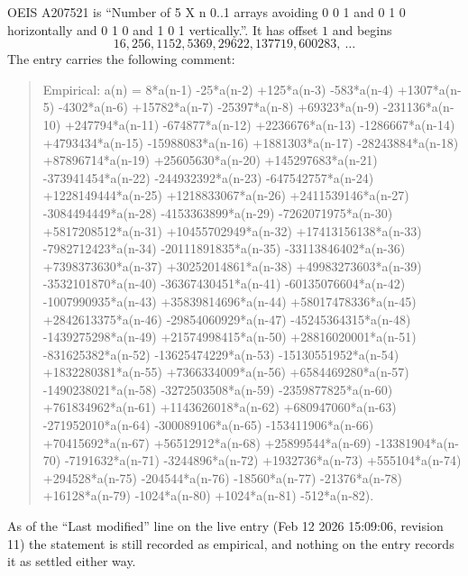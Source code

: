 \documentclass[11pt,a4paper]{article}
\theoremstyle{plain}
\theoremstyle{definition}
\begin{document}
OEIS A207521 is ``Number of 5 X n 0..1 arrays avoiding 0 0 1 and 0 1 0 horizontally and 0 1 0 and 1 0 1 vertically.''. It has offset
$1$ and begins
\[
16, 256, 1152, 5369, 29622, 137719, 600283,\ \dots
\]
The entry carries the following comment:
\begin{quote}\small
Empirical: a(n) = 8*a(n-1) -25*a(n-2) +125*a(n-3) -583*a(n-4) +1307*a(n-5) -4302*a(n-6) +15782*a(n-7) -25397*a(n-8) +69323*a(n-9) -231136*a(n-10) +247794*a(n-11) -674877*a(n-12) +2236676*a(n-13) -1286667*a(n-14) +4793434*a(n-15) -15988083*a(n-16) +1881303*a(n-17) -28243884*a(n-18) +87896714*a(n-19) +25605630*a(n-20) +145297683*a(n-21) -373941454*a(n-22) -244932392*a(n-23) -647542757*a(n-24) +1228149444*a(n-25) +1218833067*a(n-26) +2411539146*a(n-27) -3084494449*a(n-28) -4153363899*a(n-29) -7262071975*a(n-30) +5817208512*a(n-31) +10455702949*a(n-32) +17413156138*a(n-33) -7982712423*a(n-34) -20111891835*a(n-35) -33113846402*a(n-36) +7398373630*a(n-37) +30252014861*a(n-38) +49983273603*a(n-39) -3532101870*a(n-40) -36367430451*a(n-41) -60135076604*a(n-42) -1007990935*a(n-43) +35839814696*a(n-44) +58017478336*a(n-45) +2842613375*a(n-46) -29854060929*a(n-47) -45245364315*a(n-48) -1439275298*a(n-49) +21574998415*a(n-50) +28816020001*a(n-51) -831625382*a(n-52) -13625474229*a(n-53) -15130551952*a(n-54) +1832280381*a(n-55) +7366334009*a(n-56) +6584469280*a(n-57) -1490238021*a(n-58) -3272503508*a(n-59) -2359877825*a(n-60) +761834962*a(n-61) +1143626018*a(n-62) +680947060*a(n-63) -271952010*a(n-64) -300089106*a(n-65) -153411906*a(n-66) +70415692*a(n-67) +56512912*a(n-68) +25899544*a(n-69) -13381904*a(n-70) -7191632*a(n-71) -3244896*a(n-72) +1932736*a(n-73) +555104*a(n-74) +294528*a(n-75) -204544*a(n-76) -18560*a(n-77) -21376*a(n-78) +16128*a(n-79) -1024*a(n-80) +1024*a(n-81) -512*a(n-82).
\end{quote}
As of the ``Last modified'' line on the live entry (Feb 12 2026 15:09:06, revision
11) the statement is still recorded as empirical, and nothing on the entry
records it as settled either way.
\end{document}
